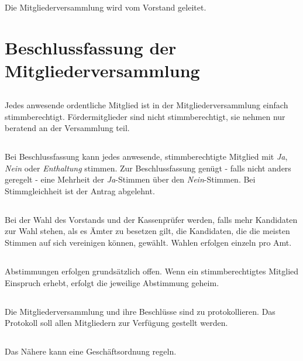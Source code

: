\documentclass[12pt]{article}
\begin{document}
\subsection{}
Die Mitgliederversammlung wird vom Vorstand geleitet.

\section{Beschlussfassung der Mitgliederversammlung}
\subsection{}
Jedes anwesende ordentliche Mitglied ist in der Mitgliederversammlung einfach stimmberechtigt. Fördermitglieder sind nicht stimmberechtigt, sie nehmen nur beratend an der Versammlung teil.
\subsection{}
Bei Beschlussfassung kann jedes anwesende, stimmberechtigte Mitglied mit \textit{Ja}, \textit{Nein} oder \textit{Enthaltung} stimmen. Zur Beschlussfassung genügt - falls nicht anders geregelt - eine Mehrheit der \textit{Ja}-Stimmen über den \textit{Nein}-Stimmen. Bei Stimmgleichheit ist der Antrag abgelehnt.
\subsection{}
Bei der Wahl des Vorstands und der Kassenprüfer werden, falls mehr Kandidaten zur Wahl stehen, als es Ämter zu besetzen gilt, die Kandidaten, die die meisten Stimmen auf sich vereinigen können, gewählt. Wahlen erfolgen einzeln pro Amt.
\subsection{}
Abstimmungen erfolgen grundsätzlich offen. Wenn ein stimmberechtigtes Mitglied Einspruch erhebt, erfolgt die jeweilige Abstimmung geheim.
\subsection{}
Die Mitgliederversammlung und ihre Beschlüsse sind zu protokollieren. Das Protokoll soll allen Mitgliedern zur Verfügung gestellt werden.
\subsection{}
Das Nähere kann eine Geschäftsordnung regeln.
\end{document}
